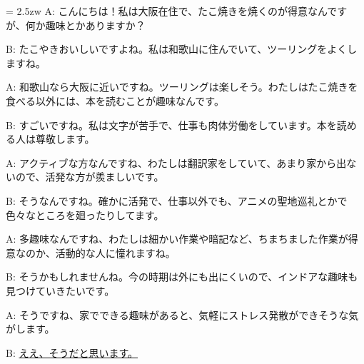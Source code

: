 \documentclass[11pt]{amsart}
\title{}
\author{}
\newenvironment{hangall}[1]{\hangindent = 2.5zw\everypar{\hangindent = 2.5zw}}{}
\begin{document}
\maketitle
\begin{hangall}{}%
A: こんにちは！私は大阪在住で、たこ焼きを焼くのが得意なんですが、何か趣味とかありますか？

B: たこやきおいしいですよね。私は和歌山に住んでいて、ツーリングをよくしますね。

A: 和歌山なら大阪に近いですね。ツーリングは楽しそう。わたしはたこ焼きを食べる以外には、本を読むことが趣味なんです。

B: すごいですね。私は文字が苦手で、仕事も肉体労働をしています。本を読める人は尊敬します。

A: アクティブな方なんですね、わたしは翻訳家をしていて、あまり家から出ないので、活発な方が羨ましいです。

B: そうなんですね。確かに活発で、仕事以外でも、アニメの聖地巡礼とかで色々なところを廻ったりしてます。

A: 多趣味なんですね、わたしは細かい作業や暗記など、ちまちました作業が得意なのか、活動的な人に憧れますね。

B: そうかもしれませんね。今の時期は外にも出にくいので、インドアな趣味も見つけていきたいです。

A: そうですね、家でできる趣味があると、気軽にストレス発散ができそうな気がします。

B: \ul{ええ、そうだと思います。}\end{hangall}
\end{document}
